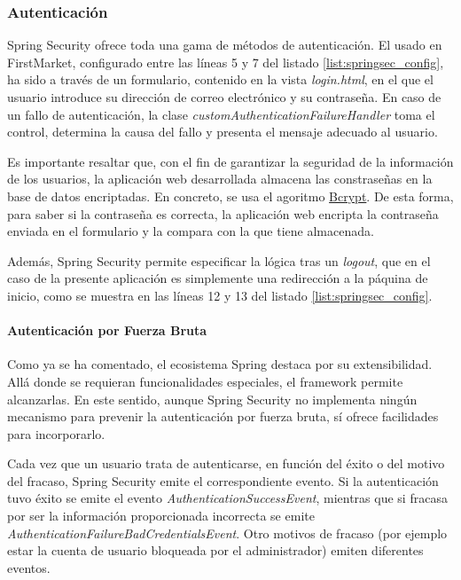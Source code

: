 \documentclass[a4paper]{article}
\begin{document}
	\subsubsection{Autenticación}
	Spring Security ofrece toda una gama de métodos de autenticación. El usado en FirstMarket, configurado entre las líneas 5 y 7 del listado \ref{list:springsec_config}, ha sido a través de un formulario, contenido en la vista \emph{login.html}, en el que el usuario introduce su dirección de correo electrónico y su contraseña. En caso de un fallo de autenticación, la clase \emph{customAuthenticationFailureHandler} toma el control, determina la causa del fallo y presenta el mensaje adecuado al usuario.
	
	Es importante resaltar que, con el fin de garantizar la seguridad de la información de los usuarios, la aplicación web desarrollada almacena las constraseñas en la base de datos encriptadas.  En concreto, se usa el agoritmo \href{https://en.wikipedia.org/wiki/Bcrypt}{Bcrypt}. De esta forma, para saber si la contraseña es correcta, la aplicación web encripta la contraseña enviada en el formulario y la compara con la que tiene almacenada.
	
	Además, Spring Security permite especificar la lógica tras un \emph{logout}, que en el caso de la presente aplicación es simplemente una redirección a la páquina de inicio, como se muestra en las líneas 12 y 13 del listado \ref{list:springsec_config}.
	
	\paragraph{Autenticación por Fuerza Bruta}
	Como ya se ha comentado, el ecosistema Spring destaca por su extensibilidad. Allá donde se requieran funcionalidades especiales, el framework permite alcanzarlas. En este sentido, aunque Spring Security no implementa ningún mecanismo para prevenir la autenticación por fuerza bruta, sí ofrece facilidades para incorporarlo.
	
	Cada vez que un usuario trata de autenticarse, en función del éxito o del motivo del fracaso, Spring Security emite el correspondiente evento. Si la autenticación tuvo éxito se emite el evento \emph{AuthenticationSuccessEvent}, mientras que si fracasa por ser la información proporcionada incorrecta se emite \emph{AuthenticationFailureBadCredentialsEvent}. Otro motivos de fracaso (por ejemplo estar la cuenta de usuario bloqueada por el administrador) emiten diferentes eventos.
	
\end{document}

